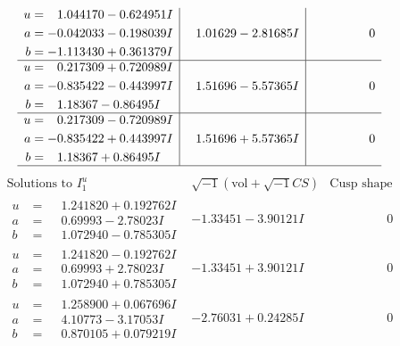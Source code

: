 \documentclass[1p]{elsarticle_modified}
\theoremstyle{definition}
\newcommand{\I}{\sqrt{-1}}
\begin{document}
$$\begin{array}{c|c|c}
\begin{aligned}
u &= \phantom{-}1.044170 - 0.624951 I \\
a &= -0.042033 - 0.198039 I \\
b &= -1.113430 + 0.361379 I\end{aligned}
 & \phantom{-}1.01629 - 2.81685 I & \phantom{-0.000000 } 0 \\ \hline\begin{aligned}
u &= \phantom{-}0.217309 + 0.720989 I \\
a &= -0.835422 - 0.443997 I \\
b &= \phantom{-}1.18367 - 0.86495 I\end{aligned}
 & \phantom{-}1.51696 - 5.57365 I & \phantom{-0.000000 } 0 \\ \hline\begin{aligned}
u &= \phantom{-}0.217309 - 0.720989 I \\
a &= -0.835422 + 0.443997 I \\
b &= \phantom{-}1.18367 + 0.86495 I\end{aligned}
 & \phantom{-}1.51696 + 5.57365 I & \phantom{-0.000000 } 0\\
 \hline 
 \end{array}$$\newpage$$\begin{array}{c|c|c}  
\text{Solutions to }I^u_{1}& \I (\text{vol} + \sqrt{-1}CS) & \text{Cusp shape}\\
 \hline 
\begin{aligned}
u &= \phantom{-}1.241820 + 0.192762 I \\
a &= \phantom{-}0.69993 - 2.78023 I \\
b &= \phantom{-}1.072940 - 0.785305 I\end{aligned}
 & -1.33451 - 3.90121 I & \phantom{-0.000000 } 0 \\ \hline\begin{aligned}
u &= \phantom{-}1.241820 - 0.192762 I \\
a &= \phantom{-}0.69993 + 2.78023 I \\
b &= \phantom{-}1.072940 + 0.785305 I\end{aligned}
 & -1.33451 + 3.90121 I & \phantom{-0.000000 } 0 \\ \hline\begin{aligned}
u &= \phantom{-}1.258900 + 0.067696 I \\
a &= \phantom{-}4.10773 - 3.17053 I \\
b &= \phantom{-}0.870105 + 0.079219 I\end{aligned}
 & -2.76031 + 0.24285 I & \phantom{-0.000000 } 0 \\ \hline\begin{aligned}

\end{aligned}
\end{array}$$
\end{document}

